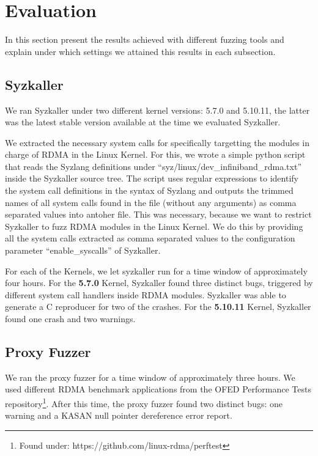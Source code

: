 \section{Evaluation}

In this section present the results achieved with different
fuzzing tools and explain under which settings we attained this results
in each subsection.

\subsection{Syzkaller}

We ran Syzkaller under two different kernel versions: 5.7.0 and 5.10.11, the latter was
the latest stable version available at the time we evaluated Syzkaller.

We extracted the necessary system calls for specifically targetting the modules
in charge of RDMA in the Linux Kernel. For this, we wrote a simple python script
that reads the Syzlang definitions under ``syz/linux/dev\_infiniband\_rdma.txt'' inside the
Syzkaller source tree. The script uses regular expressions to identify the system call definitions
in the syntax of Syzlang and outputs the trimmed names of all system calls found in the file (without any arguments)
as comma separated values into antoher file. This was necessary, because we want to restrict Syzkaller
to fuzz RDMA modules in the Linux Kernel. We do this by providing all the system calls
extracted as comma separated values to the configuration parameter ``enable\_syscalls'' of Syzkaller.


For each of the Kernels, we let syzkaller run for a time window of approximately four hours.
For the \textbf{5.7.0} Kernel, Syzkaller found three distinct bugs,
triggered by different system call handlers inside RDMA modules. Syzkaller was able to generate
a C reproducer for two of the crashes.
For the \textbf{5.10.11} Kernel, Syzkaller found one crash and two warnings.






\subsection{Proxy Fuzzer}

We ran the proxy fuzzer for a time window of approximately three hours.
We used different RDMA benchmark applications from the OFED Performance Tests repository\footnote{Found under: https://github.com/linux-rdma/perftest}.
After this time, the proxy fuzzer found two distinct bugs: one warning and a KASAN null pointer dereference error report.


